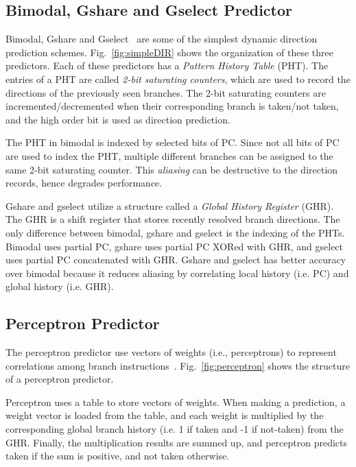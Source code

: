 \subsection{Bimodal, Gshare and Gselect Predictor}
\label{sec:background:dirpred:bimodal}
Bimodal, Gshare and Gselect~\cite{McFarling} are some of the simplest dynamic direction prediction schemes. Fig.~\ref{fig:simpleDIR} shows the organization of these three predictors. Each of these predictors has a \textit{Pattern History Table} (PHT). The entries of a PHT are called \textit{2-bit saturating counters}, which are used to record the directions of the previously seen branches. The 2-bit saturating counters are incremented/decremented when their corresponding branch is taken/not taken, and the high order bit is used as direction prediction.

The PHT in bimodal is indexed by selected bits of PC. Since not all bits of PC are used to index the PHT, multiple different branches can be assigned to the same 2-bit saturating counter. This \textit{aliasing} can be destructive to the direction records, hence degrades performance.

Gshare and gselect utilize a structure called a \textit{Global History Register} (GHR). The GHR is a shift register that stores recently resolved branch directions. The only difference between bimodal, gshare and gselect is the indexing of the PHTs. Bimodal uses partial PC, gshare uses partial PC XORed with GHR, and gselect uses partial PC concatenated with GHR. Gshare and gselect has better accuracy over bimodal because it reduces aliasing by correlating local history (i.e. PC) and global history (i.e. GHR).


\subsection{Perceptron Predictor}
\label{sec:background:dirpred:perceptron}
The perceptron predictor use vectors of weights (i.e., perceptrons) to represent correlations among branch instructions~\cite{perceptron}. Fig.~\ref{fig:perceptron} shows the structure of a perceptron predictor.

Perceptron uses a table to store vectors of weights. When making a prediction, a weight vector is loaded from the table, and each weight is multiplied by the corresponding global branch history (i.e. 1 if taken and -1 if not-taken) from the GHR. Finally, the multiplication results are summed up, and perceptron predicts taken if the sum is positive, and not taken otherwise.


